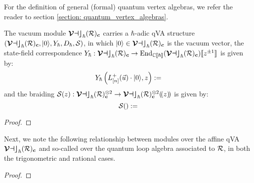         For the definition of general (formal) quantum vertex algebras, we refer the reader to section \ref{section: quantum_vertex_algebras}.
        \begin{proposition} \label{prop: trigonometric_and_rational_affine_qVAs}
            The vacuum module $\boldsymbol{ \mathcal{Vac} }_{\hbar}(\mathcal{R})_{\boldsymbol{c}}$ carries a $\hbar$-adic qVA structure $( \boldsymbol{ \mathcal{Vac} }_{\hbar}(\mathcal{R})_{\boldsymbol{c}}, \lvert {0} \rangle, Y_{\hbar}, D_{\hbar}, \mathcal{S} )$, in which $\lvert {0} \rangle \in \boldsymbol{ \mathcal{Vac} }_{\hbar}(\mathcal{R})_{\boldsymbol{c}}$ is the vacuum vector, the state-field correspondence $Y_{\hbar}: \boldsymbol{ \mathcal{Vac} }_{\hbar}(\mathcal{R})_{\boldsymbol{c}} \to \operatorname{End}_{\mathbb{C}[\![\hbar]\!]}( \boldsymbol{ \mathcal{Vac} }_{\hbar}(\mathcal{R})_{\boldsymbol{c}} )[\![z^{\pm 1}]\!]$ is given by:
                \begin{equation} \label{equation: trigonometric_and_rational_qVAs_state_field_correpsondence}
                    Y_{\hbar}\left( L^+_{[n]}(\vec{u}) \cdot \lvert {0} \rangle, z \right) := 
                \end{equation}
            and the braiding $\calS(z): \vacuum_{\hbar}(\calR)_{\level}^{\tensor 2} \to \vacuum_{\hbar}(\calR)_{\level}^{\tensor 2}(\!(z)\!)$ is given by:
                \begin{equation} \label{equation: trigonometric_and_rational_qVAs_braiding}
                    \mathcal{S}() := 
                \end{equation}
        \end{proposition}
            \begin{proof}
                
            \end{proof}

        Next, we note the following relationship between modules over the affine qVA $\boldsymbol{ \mathcal{Vac} }_{\hbar}(\mathcal{R})_{\boldsymbol{c}}$ and so-called  over the quantum loop algebra associated to $\mathcal{R}$, in both the trigonometric and rational cases.
        \begin{definition} \label{def: restricted_modules_over_loop_QUEs}
            
        \end{definition}
        \begin{proposition} \label{prop: qVOA_quasi_modules_and_loop_QUE_restricted_modules}
            
        \end{proposition}
            \begin{proof}
                
            \end{proof}

